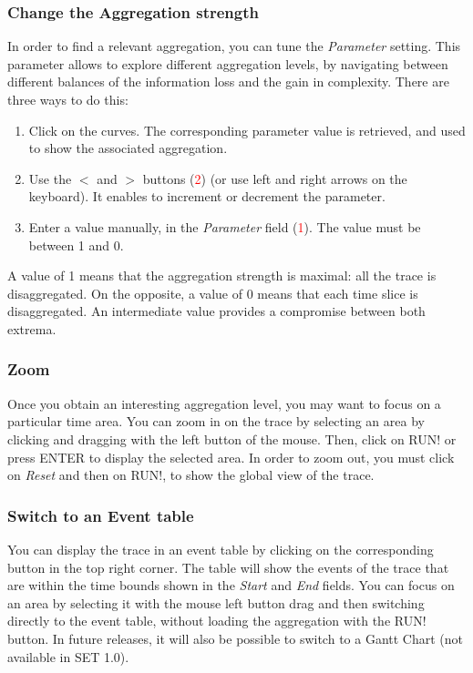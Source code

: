 \documentclass[twoside]{article}
\begin{document}
\begin{sloppypar}
\subsubsection{Change the Aggregation strength}
In order to find a relevant aggregation, you can tune the \textit{Parameter} setting. This parameter allows to explore different aggregation levels, by navigating between different balances of the information loss and the gain in complexity. There are three ways to do this:
\begin{enumerate}
	\item Click on the curves. The corresponding parameter value is retrieved, and used to show the associated aggregation.
	\item Use the $<$ and $>$ buttons (\textcolor{red}{2}) (or use left and right arrows on the keyboard). It enables to increment or decrement the parameter.
	\item Enter a value manually, in the \textit{Parameter} field (\textcolor{red}{1}). The value must be between 1 and 0.
\end{enumerate}
A value of 1 means that the aggregation strength is maximal: all the trace is disaggregated. On the opposite, a value of 0 means that each time slice is disaggregated. An intermediate value provides a compromise between both extrema.

\subsubsection{Zoom}
Once you obtain an interesting aggregation level, you may want to focus on a particular time area. You can zoom in on the trace by selecting an area by clicking and dragging with the left button of the mouse. Then, click on RUN! or press ENTER to display the selected area. In order to zoom out, you must click on \textit{Reset} and then on RUN!, to show the global view of the trace.

\subsubsection{Switch to an Event table}
You can display the trace in an event table by clicking on the corresponding button in the top right corner. The table will show the events of the trace that are within the time bounds shown in the \textit{Start} and \textit{End} fields. You can focus on an area by selecting it with the mouse left button drag and then switching directly to the event table, without loading the aggregation with the RUN! button. In future releases, it will also be possible to switch to a Gantt Chart (not available in SET 1.0).



\end{sloppypar}
\end{document}
